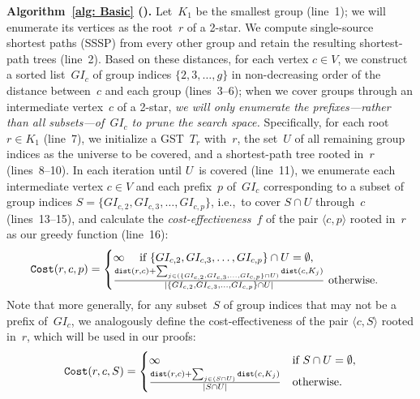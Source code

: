 \textbf{Algorithm~\ref{alg: Basic} (\Basic).}
Let~$K_1$ be the smallest group (line~1); we will enumerate its vertices as the root~$r$ of a 2-star. We compute single-source shortest paths (SSSP) from every other group and retain the resulting shortest-path trees (line~2). Based on these distances, for each vertex $c \in V$, we construct a sorted list~$GI_c$ of group indices $\{2,3,\ldots,g\}$ in non-decreasing order of the distance between~$c$ and each group (lines~3--6);
when we cover groups through an intermediate vertex~$c$ of a 2-star, \emph{we will only enumerate the prefixes---rather than all subsets---of~$GI_c$ to prune the search space.}
Specifically, for each root $r \in K_1$ (line~7), we initialize a GST~$T_r$ with~$r$, the set~$U$ of all remaining group indices as the universe to be covered, and a shortest-path tree rooted in~$r$ (lines~8--10). In each iteration until $U$~is covered (line~11), we enumerate each intermediate vertex $c \in V$ and each prefix~$p$ of~$GI_c$ corresponding to a subset of group indices $S=\{GI_{c,2},GI_{c,3},\dots,GI_{c,p}\}$, i.e.,~to cover $S \cap U$ through~$c$ (lines~13--15), and calculate the \emph{cost-effectiveness}~$f$ of the pair $\langle c,p \rangle$ rooted in~$r$ as our greedy function (line~16):
\begin{equation}
\resizebox{0.92\linewidth}{!}{$
\displaystyle
\begin{aligned}
\label{eq: defi_cost}
    \Cost(r,c,p) =
    \begin{cases}
        \infty \quad \text{ if } \{GI_{c,2},GI_{c,3},\dots,GI_{c,p}\} \cap U = \emptyset,\\
        \frac{\dist(r,c)+\sum_{j\in (\{GI_{c,2},GI_{c,3},\dots,GI_{c,p}\} \cap U)} \dist(c,K_j)}{|\{GI_{c,2},GI_{c,3},\dots,GI_{c,p}\} \cap U|} \text{ otherwise.}
    \end{cases}
\end{aligned}
$}
\end{equation}
\noindent Note that more generally, for any subset~$S$ of group indices that may not be a prefix of~$GI_c$, we analogously define the cost-effectiveness of the pair $\langle c,S \rangle$ rooted in~$r$, which will be used in our proofs:
\begin{gather}
\label{eq: defi_cost_by_set}
    \mathtt{Cost}(r,c,S) =
    \begin{cases}
        \infty & \text{if } S \cap U = \emptyset,\\
        \frac{\mathtt{dist}(r,c)+\sum_{j\in (S \cap U)} \mathtt{dist}(c,K_j)}{|S \cap U|} & \text{otherwise.}
    \end{cases}
\end{gather}
